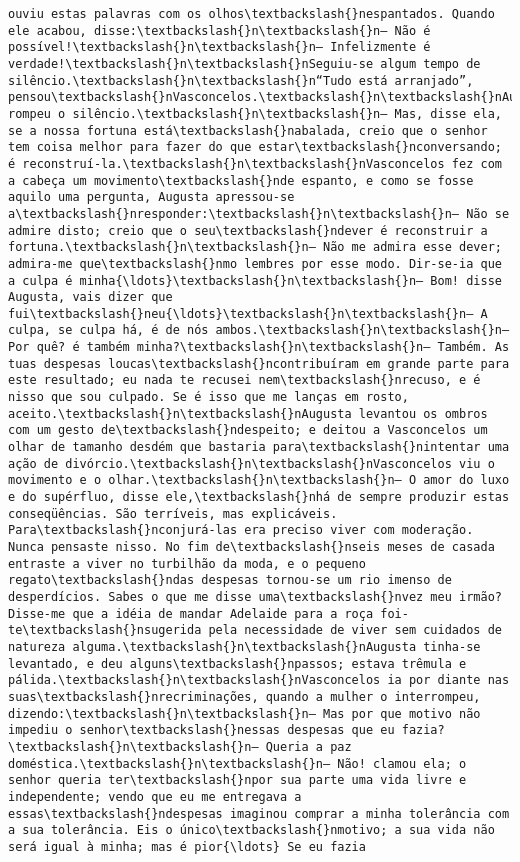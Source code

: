 \documentclass[11pt]{article}
\begin{document}
\begin{Verbatim}[commandchars=\\\{\}]
ouviu estas palavras com os olhos\textbackslash{}nespantados. Quando ele acabou, disse:\textbackslash{}n\textbackslash{}n— Não é possível!\textbackslash{}n\textbackslash{}n— Infelizmente é verdade!\textbackslash{}n\textbackslash{}nSeguiu-se algum tempo de silêncio.\textbackslash{}n\textbackslash{}n“Tudo está arranjado”, pensou\textbackslash{}nVasconcelos.\textbackslash{}n\textbackslash{}nAugusta rompeu o silêncio.\textbackslash{}n\textbackslash{}n— Mas, disse ela, se a nossa fortuna está\textbackslash{}nabalada, creio que o senhor tem coisa melhor para fazer do que estar\textbackslash{}nconversando; é reconstruí-la.\textbackslash{}n\textbackslash{}nVasconcelos fez com a cabeça um movimento\textbackslash{}nde espanto, e como se fosse aquilo uma pergunta, Augusta apressou-se a\textbackslash{}nresponder:\textbackslash{}n\textbackslash{}n— Não se admire disto; creio que o seu\textbackslash{}ndever é reconstruir a fortuna.\textbackslash{}n\textbackslash{}n— Não me admira esse dever; admira-me que\textbackslash{}nmo lembres por esse modo. Dir-se-ia que a culpa é minha{\ldots}\textbackslash{}n\textbackslash{}n— Bom! disse Augusta, vais dizer que fui\textbackslash{}neu{\ldots}\textbackslash{}n\textbackslash{}n— A culpa, se culpa há, é de nós ambos.\textbackslash{}n\textbackslash{}n— Por quê? é também minha?\textbackslash{}n\textbackslash{}n— Também. As tuas despesas loucas\textbackslash{}ncontribuíram em grande parte para este resultado; eu nada te recusei nem\textbackslash{}nrecuso, e é nisso que sou culpado. Se é isso que me lanças em rosto, aceito.\textbackslash{}n\textbackslash{}nAugusta levantou os ombros com um gesto de\textbackslash{}ndespeito; e deitou a Vasconcelos um olhar de tamanho desdém que bastaria para\textbackslash{}nintentar uma ação de divórcio.\textbackslash{}n\textbackslash{}nVasconcelos viu o movimento e o olhar.\textbackslash{}n\textbackslash{}n— O amor do luxo e do supérfluo, disse ele,\textbackslash{}nhá de sempre produzir estas conseqüências. São terríveis, mas explicáveis. Para\textbackslash{}nconjurá-las era preciso viver com moderação. Nunca pensaste nisso. No fim de\textbackslash{}nseis meses de casada entraste a viver no turbilhão da moda, e o pequeno regato\textbackslash{}ndas despesas tornou-se um rio imenso de desperdícios. Sabes o que me disse uma\textbackslash{}nvez meu irmão? Disse-me que a idéia de mandar Adelaide para a roça foi-te\textbackslash{}nsugerida pela necessidade de viver sem cuidados de natureza alguma.\textbackslash{}n\textbackslash{}nAugusta tinha-se levantado, e deu alguns\textbackslash{}npassos; estava trêmula e pálida.\textbackslash{}n\textbackslash{}nVasconcelos ia por diante nas suas\textbackslash{}nrecriminações, quando a mulher o interrompeu, dizendo:\textbackslash{}n\textbackslash{}n— Mas por que motivo não impediu o senhor\textbackslash{}nessas despesas que eu fazia?\textbackslash{}n\textbackslash{}n— Queria a paz doméstica.\textbackslash{}n\textbackslash{}n— Não! clamou ela; o senhor queria ter\textbackslash{}npor sua parte uma vida livre e independente; vendo que eu me entregava a essas\textbackslash{}ndespesas imaginou comprar a minha tolerância com a sua tolerância. Eis o único\textbackslash{}nmotivo; a sua vida não será igual à minha; mas é pior{\ldots} Se eu fazia 
\end{Verbatim}
\end{document}
